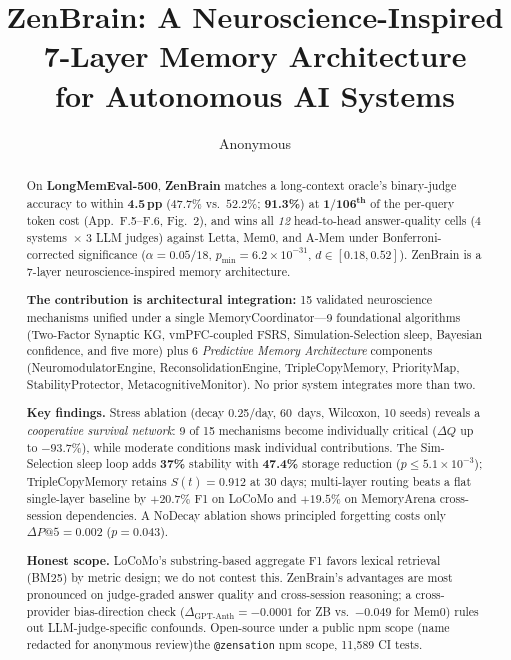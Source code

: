 \documentclass{article}
\title{ZenBrain: A Neuroscience-Inspired 7-Layer Memory Architecture\\for Autonomous AI Systems}
\author{Anonymous}
\makeatletter
\newcommand{\anon}[2]{\if@anonymous #2\else #1\fi}
\makeatother
\begin{document}
\maketitle

\begin{abstract}
On \textbf{LongMemEval-500}, \textbf{ZenBrain} matches a long-context
oracle's binary-judge accuracy to within \textbf{4.5\,pp}
($47.7\%$ vs.\ $52.2\%$; \textbf{91.3\%}) at
$\mathbf{1/106^\text{th}}$ of the per-query token cost
(App.~F.5--F.6, Fig.~2), and wins all \emph{12} head-to-head
answer-quality cells (4 systems~$\times$ 3 LLM judges) against
Letta, Mem0, and A-Mem under
Bonferroni-corrected significance ($\alpha{=}0.05/18$,
$p_{\min}{=}6.2\times 10^{-31}$, $d \in [0.18, 0.52]$).
ZenBrain is a 7-layer neuroscience-inspired memory architecture.

\textbf{The contribution is architectural integration:}
15 validated neuroscience mechanisms unified under a single
MemoryCoordinator---9 foundational algorithms (Two-Factor Synaptic KG,
vmPFC-coupled FSRS, Simulation-Selection sleep, Bayesian confidence,
and five more) plus 6 \emph{Predictive Memory Architecture} components
(NeuromodulatorEngine, ReconsolidationEngine, TripleCopyMemory,
PriorityMap, StabilityProtector, MetacognitiveMonitor). No prior
system integrates more than two.

\textbf{Key findings.} Stress ablation (decay 0.25/day, 60~days,
Wilcoxon, 10 seeds) reveals a \emph{cooperative survival network}:
9 of 15 mechanisms become individually critical ($\Delta Q$ up to
$-93.7\%$), while moderate conditions mask individual contributions. The Sim-Selection sleep loop adds \textbf{37\%}
stability with \textbf{47.4\%} storage reduction ($p \le 5.1\times 10^{-3}$);
TripleCopyMemory retains $S(t){=}0.912$ at 30 days; multi-layer routing
beats a flat single-layer baseline by $+20.7\%$ F1 on LoCoMo
and $+19.5\%$ on MemoryArena cross-session dependencies. A NoDecay ablation shows principled forgetting costs
only $\Delta P@5{=}0.002$ ($p{=}0.043$).

\textbf{Honest scope.} LoCoMo's substring-based aggregate F1 favors
lexical retrieval (BM25) by metric design; we do not contest this.
ZenBrain's advantages are most pronounced on judge-graded answer
quality and cross-session reasoning; a cross-provider bias-direction
check ($\Delta_{\text{GPT-Anth}}{=}{-}0.0001$ for ZB vs.\ ${-}0.049$
for Mem0) rules out LLM-judge-specific confounds.
Open-source under \anon{the \texttt{@zensation} npm scope}{a public
npm scope (name redacted for anonymous review)}, 11{,}589 CI tests.
\end{abstract}
\end{document}
